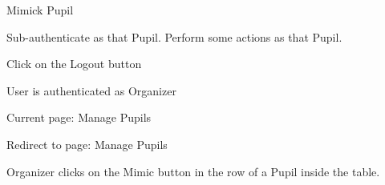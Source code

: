 
\begin{uc}{Mimick Pupil}

    \begin{uc-mss}
    \item Sub-authenticate as that Pupil.  Perform some actions
        as that Pupil.
    \item Click on the Logout button
    \end{uc-mss}

    \begin{uc-pre}
    \item User is authenticated as Organizer
    \item Current page: Manage Pupils
    \end{uc-pre}

    \begin{uc-post}
    \item Redirect to page: Manage Pupils
    \end{uc-post}

    \begin{uc-trig}
        Organizer clicks on the Mimic button in the row of a Pupil inside the
        table.
    \end{uc-trig}

\end{uc}

